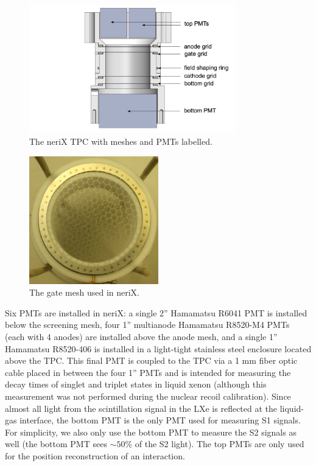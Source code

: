 \begin{figure}[t]
        \centering
	\includegraphics[width=0.8\textwidth]{nerix_tpc_labeled}
	\caption{The neriX TPC with meshes and PMTs labelled.}
	\label{fig:nerix_tpc_labeled}
\end{figure}
   
   
\begin{figure}[bt]
        \centering
	\includegraphics[width=0.5\textwidth]{nerix_tpc_mesh}
	\caption{The gate mesh used in neriX.}
	\label{fig:nerix_tpc_mesh}
\end{figure}



Six PMTs are installed in neriX: a single 2'' Hamamatsu R6041 PMT is installed below the screening mesh, four 1'' multianode Hamamatsu R8520-M4 PMTs (each with 4 anodes) are installed above the anode mesh, and a single 1'' Hamamatsu R8520-406 is installed in a light-tight stainless steel enclosure located above the TPC.  This final PMT is coupled to the TPC via a 1 mm fiber optic cable placed in between the four 1'' PMTs and is intended for measuring the decay times of singlet and triplet states in liquid xenon (although this measurement was not performed during the nuclear recoil calibration).  Since almost all light from the scintillation signal in the LXe is reflected at the liquid-gas interface, the bottom PMT is the only PMT used for measuring S1 signals.  For simplicity, we also only use the bottom PMT to measure the S2 signals as well (the bottom PMT sees $\sim 50\%$ of the S2 light).  The top PMTs are only used for the position reconstruction of an interaction.

